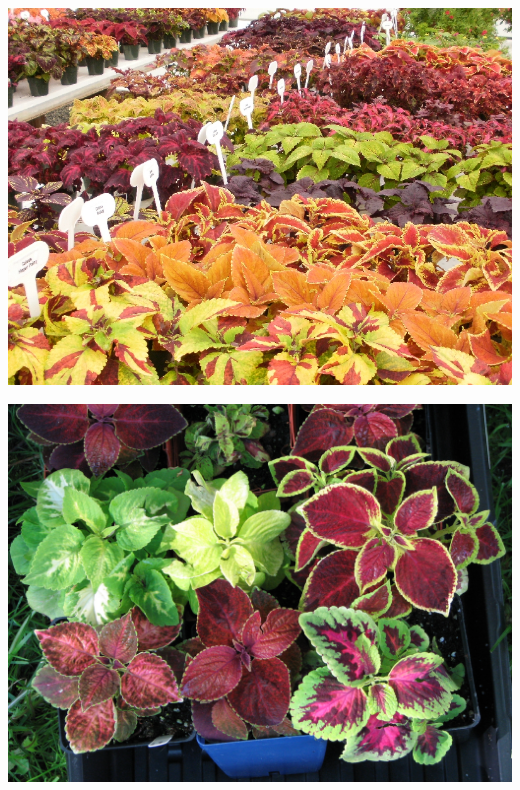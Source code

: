 \documentclass{article}
\begin{document}
\begin{center}
\includegraphics[height=0.925\paperheight]{../Coleus1.jpg}
\end{center}
\newpage

\begin{center}
\includegraphics[height=0.925\paperheight]{../Coleus_hybrids.jpg}
\end{center}
\newpage
\end{document}
